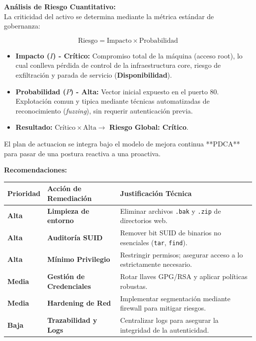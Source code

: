 \documentclass[11pt,a4paper]{article}
\begin{document}
\textbf{Análisis de Riesgo Cuantitativo:} \\
La criticidad del activo se determina mediante la métrica estándar de gobernanza:

$$\text{Riesgo} = \text{Impacto} \times \text{Probabilidad}$$

\begin{itemize}
    \item \textbf{Impacto ($I$) - Crítico:} Compromiso total de la máquina (acceso root), lo cual conlleva pérdida de control de la infraestructura core, riesgo de exfiltración y parada de servicio (\textbf{Disponibilidad}).
    \item \textbf{Probabilidad ($P$) - Alta:} Vector inicial expuesto en el puerto 80. Explotación comun y tipica mediante técnicas automatizadas de reconocimiento (\textit{fuzzing}), sin requerir autenticación previa.
    \item \textbf{Resultado:} $\text{Crítico} \times \text{Alta} \rightarrow$ \textbf{Riesgo Global: Crítico}.
\end{itemize}

El plan de actuacion se integra bajo el modelo de mejora continua **PDCA** para pasar de una postura reactiva a una proactiva.

\vspace{0.4cm}

\textbf{Recomendaciones:}

\vspace{0.4cm}
\begin{table}[h!]
\centering
\small
\begin{tabular}{lll}
\toprule
\textbf{Prioridad} & \textbf{Acción de Remediación} & \textbf{Justificación Técnica} \\ \midrule
\textbf{Alta}  & \textbf{Limpieza de entorno} & Eliminar archivos \texttt{.bak} y \texttt{.zip} de directorios web. \\
\textbf{Alta}  & \textbf{Auditoría SUID} & Remover bit SUID de binarios no esenciales (\texttt{tar}, \texttt{find}). \\
\textbf{Alta}  & \textbf{Mínimo Privilegio} & Restringir permisos; asegurar acceso a lo estrictamente necesario. \\
\textbf{Media} & \textbf{Gestión de Credenciales} & Rotar llaves GPG/RSA y aplicar políticas robustas. \\
\textbf{Media} & \textbf{Hardening de Red} & Implementar segmentación mediante firewall para mitigar riesgos. \\
\textbf{Baja}  & \textbf{Trazabilidad y Logs} & Centralizar logs para asegurar la integridad de la autenticidad. \\ \bottomrule
\end{tabular}
\end{table}

\vspace{0.8cm}
\end{document}
